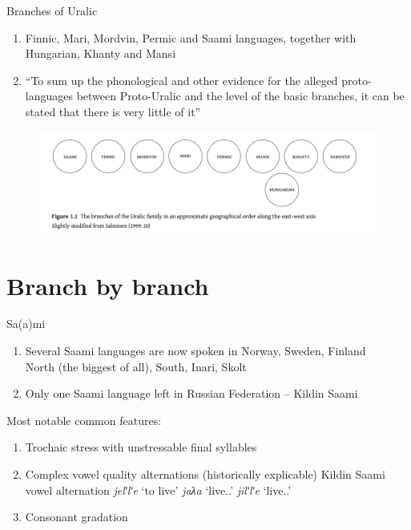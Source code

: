 \documentclass[10 pt, handout]{beamer}
\begin{document}
\begin{frame}{Branches of Uralic}

	\begin{enumerate}[$\gg$]
		\item Finnic, Mari, Mordvin, Permic and Saami languages, together with Hungarian, Khanty and Mansi  
		\item ``To sum up the phonological and other evidence for the alleged proto-languages between Proto-Uralic and the level of the basic branches, it can be stated that there is very little of it'' \parencite{salminen2002}
	\end{enumerate}
	
	\begin{figure}[H]
		\centering
		\includegraphics[scale=.37]{uralic-continuum}
		\parencite{aikio2022}
	\end{figure}

\end{frame}

	\section{Branch by branch}

\begin{frame}{Sa(a)mi}

	\begin{enumerate}[$\gg$]
		\item Several Saami languages are now spoken in Norway, Sweden, Finland\\
			North (the biggest of all), South, Inari, Skolt
		\item Only one Saami language left in Russian Federation -- Kildin Saami
	\end{enumerate}
	Most notable common features:

	\begin{enumerate}[$\gg$]
		\item Trochaic stress with unstressable final syllables
		\item Complex vowel quality alternations (historically explicable)
			\pex Kildin Saami vowel alternation \parencite{kert1971}
				\a \emph{jelʹlʹe} \hfill `to live'
				\a \emph{jaλa} \hfill `live.{\Prs}.{\Fsg}'
				\a \emph{jilʹlʹe} \hfill `live.{\Impf}.{\Fsg}'
			\xe
		\item Consonant gradation
	\end{enumerate}

\end{frame}
\end{document}
